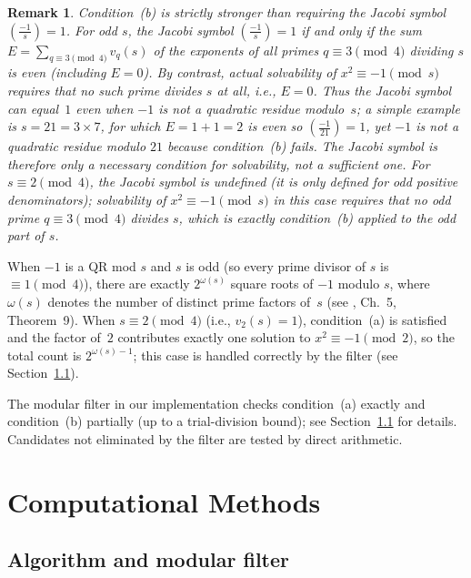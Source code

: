 \documentclass[12pt]{article}
\newtheorem{remark}{Remark}
\begin{document}
	\begin{remark}\label{rem:jacobi}
		Condition~(b) is strictly stronger than requiring the Jacobi symbol
		$\left(\frac{-1}{s}\right) = 1$.
		For odd $s$, the Jacobi symbol $\left(\frac{-1}{s}\right) = 1$ if and
		only if the \emph{sum} $E = \sum_{q \equiv 3 \pmod{4}} v_q(s)$ of the
		exponents of all primes $q \equiv 3 \pmod{4}$ dividing $s$ is even
		(including $E = 0$).
		By contrast, actual solvability of $x^2 \equiv -1 \pmod{s}$ requires
		that no such prime divides $s$ at all, i.e., $E = 0$.
		Thus the Jacobi symbol can equal~$1$ even when $-1$ is \emph{not} a
		quadratic residue modulo~$s$; a simple example is $s = 21 = 3 \times 7$,
		for which $E = 1 + 1 = 2$ is even so $\left(\frac{-1}{21}\right) = 1$,
		yet $-1$ is not a quadratic residue modulo $21$ because condition~(b)
		fails.
		The Jacobi symbol is therefore only a necessary condition for
		solvability, not a sufficient one.
		For $s \equiv 2 \pmod{4}$, the Jacobi symbol is undefined (it is only
		defined for odd positive denominators); solvability of
		$x^2 \equiv -1 \pmod{s}$ in this case requires that no odd prime
		$q \equiv 3 \pmod{4}$ divides $s$, which is exactly condition~(b)
		applied to the odd part of $s$.
	\end{remark}
	
	When $-1$ is a QR mod $s$ and $s$ is odd (so every prime divisor of
	$s$ is $\equiv 1 \pmod{4}$), there are exactly $2^{\omega(s)}$ square
	roots of $-1$ modulo $s$, where $\omega(s)$ denotes the number of
	distinct prime factors of~$s$ (see \cite{IrelandRosen}, Ch.~5,
	Theorem~9).
	When $s \equiv 2 \pmod{4}$ (i.e., $v_2(s) = 1$), condition~(a) is
	satisfied and the factor of~$2$ contributes exactly one solution to
	$x^2 \equiv -1 \pmod{2}$, so the total count is $2^{\omega(s)-1}$;
	this case is handled correctly by the filter
	(see Section~\ref{sec:filter}).
	
	The modular filter in our implementation checks condition~(a) exactly
	and condition~(b) partially (up to a trial-division bound); see
	Section~\ref{sec:filter} for details.
	Candidates not eliminated by the filter are tested by direct arithmetic.
	
	\section{Computational Methods}
	
	\subsection{Algorithm and modular filter}
	\label{sec:filter}
	
\end{document}
